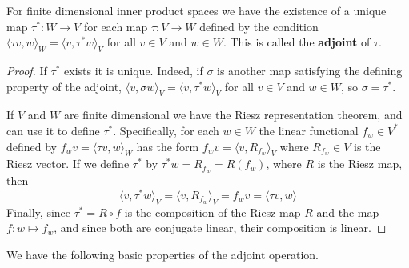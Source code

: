 For finite dimensional inner product spaces we have the existence of a unique map $\tau^*:W\rightarrow V$ for each map $\tau:V\rightarrow W$ defined by the condition $\langle \tau v,w\rangle_W = \langle v,\tau^*w\rangle_V$ for all $v \in V$ and $w \in W$. This is called the \textbf{adjoint} of $\tau$.
\begin{proof}
    If $\tau^*$ exists it is unique. Indeed, if $\sigma$ is another map satisfying the defining property of the adjoint, $\langle v,\sigma w\rangle_V = \langle v,\tau^*w\rangle_V$ for all $v\in V$ and $w \in W$, so $\sigma = \tau^*$.

    If $V$ and $W$ are finite dimensional we have the Riesz representation theorem, and can use it to define $\tau^*$. Specifically, for each $w \in W$ the linear functional $f_w \in V^*$ defined by $f_wv = \langle \tau v,w\rangle_W$ has the form $f_wv = \langle v,R_{f_w}\rangle_V$ where $R_{f_w} \in V$ is the Riesz vector. If we define $\tau^*$ by $\tau^*w = R_{f_w} = R(f_w)$, where $R$ is the Riesz map, then $$\langle v,\tau^*w\rangle_V = \langle v,R_{f_w}\rangle_V = f_wv = \langle \tau v,w\rangle$$
    Finally, since $\tau^* = R\circ f$ is the composition of the Riesz map $R$ and the map $f:w\mapsto f_w$, and since both are conjugate linear, their composition is linear.
\end{proof}

We have the following basic properties of the adjoint operation.

